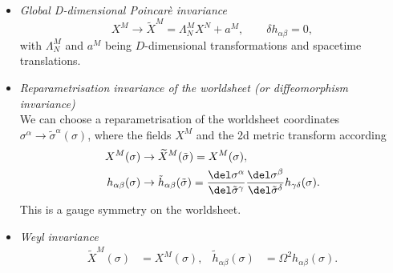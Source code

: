 \begin{itemize}
\item\textit{Global D-dimensional Poincarè invariance} 
%
\begin{equation}
X^{M} \rightarrow \widetilde{X}^{M} = \Lambda_{N}^{M} X^{N} + a^{M}, \qquad \delta	h_{\alpha\beta} = 0,
\end{equation}
%
with $\Lambda_{N}^{M}$ and $a^{M}$ being $D$-dimensional  transformations and spacetime translations.
%
%
\item\textit{Reparametrisation invariance of the worldsheet (or diffeomorphism invariance)}\\
We can choose a reparametrisation of the worldsheet coordinates $\sigma^{\alpha}\rightarrow \tilde{\sigma}^{\alpha}(\sigma)$, where the fields $X^{M}$ and the 2d metric transform according
%
\begin{equation}
\begin{alignedat}{3}
X^{M}(\sigma) &\rightarrow \widetilde{X}^{M}(\tilde{\sigma}) = X^{M}(\sigma), \\
h_{\alpha\beta}(\sigma) &\rightarrow \tilde{h}_{\alpha\beta}(\tilde{\sigma}) = \frac{\del \sigma^{\alpha}}{\del \tilde{\sigma}^{\gamma}} \frac{\del \sigma^{\beta}}{\del \tilde{\sigma}^{\delta}}h_{\gamma\delta}(\sigma).
\end{alignedat}
\end{equation}
%
This is a gauge symmetry on the worldsheet.
%
%
\item\textit{Weyl invariance} 
\begin{align}
\widetilde{X}^{M}(\sigma) &= X^{M}(\sigma), &  \tilde{h}_{\alpha\beta}(\sigma)&=\Omega^{2}h_{\alpha\beta}(\sigma).
\end{align}
\end{itemize}